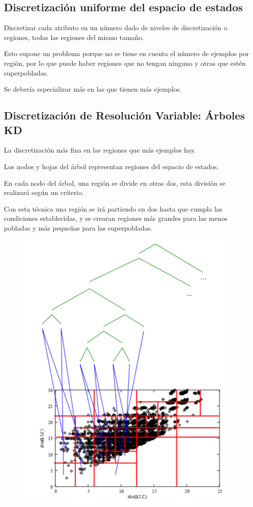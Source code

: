 \documentclass[12pt, twoside, openright]{report} %
\begin{document}
\subsection{Discretización uniforme del espacio de estados}
Discretizar cada atributo en un número dado de niveles de discretización o regiones, todas las regiones del mismo tamaño.

Esto supone un problema porque no se tiene en cuenta el número de ejemplos por región, por lo que puede haber regiones que no tengan ninguno y otras que estén superpobladas.

Se debería especializar más en las que tienen más ejemplos.

\subsection{Discretización de Resolución Variable: Árboles KD}
La discretización más fina en las regiones que más ejemplos hay.

Los nodos y hojas del árbol representan regiones del espacio de estados.

En cada nodo del árbol, una región se divide en otras dos, esta división se realizará según un criterio.

Con esta técnica una región se irá partiendo en dos hasta que cumpla las condiciones establecidas, y se crearan regiones más grandes para las menos pobladas y más pequeñas para las superpobladas.

\begin{figure}[H]
  {\includegraphics[scale=.25]{2021-04-24 14_09_21-refuerzo.pdf - Foxit Reader.png}}
\end{figure}
\end{document}
